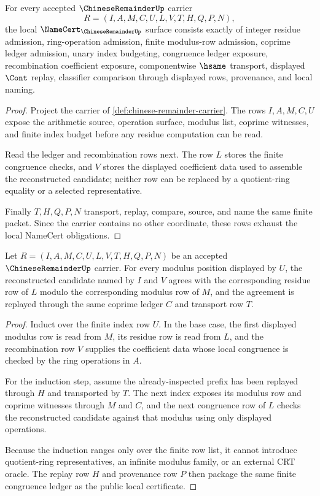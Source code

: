 \begin{theorem}
\label{thm:chinese-remainder-namecert-obligations}
For every accepted $\ChineseRemainderUp$ carrier
$$
R=(I,A,M,C,U,L,V,T,H,Q,P,N),
$$
the local $\NameCert_{\ChineseRemainderUp}$ surface consists exactly of integer residue admission, ring-operation admission, finite modulus-row admission, coprime ledger admission, unary index budgeting, congruence ledger exposure, recombination coefficient exposure, componentwise $\hsame$ transport, displayed $\Cont$ replay, classifier comparison through displayed rows, provenance, and local naming.
\end{theorem}
\begin{proof}
Project the carrier of \autoref{def:chinese-remainder-carrier}. The rows $I,A,M,C,U$ expose the arithmetic source, operation surface, modulus list, coprime witnesses, and finite index budget before any residue computation can be read.

Read the ledger and recombination rows next. The row $L$ stores the finite congruence checks, and $V$ stores the displayed coefficient data used to assemble the reconstructed candidate; neither row can be replaced by a quotient-ring equality or a selected representative.

Finally $T,H,Q,P,N$ transport, replay, compare, source, and name the same finite packet. Since the carrier contains no other coordinate, these rows exhaust the local NameCert obligations.
\end{proof}

\begin{theorem}
\label{thm:chinese-remainder-congruence-ledger}
Let $R=(I,A,M,C,U,L,V,T,H,Q,P,N)$ be an accepted $\ChineseRemainderUp$ carrier. For every modulus position displayed by $U$, the reconstructed candidate named by $I$ and $V$ agrees with the corresponding residue row of $L$ modulo the corresponding modulus row of $M$, and the agreement is replayed through the same coprime ledger $C$ and transport row $T$.
\end{theorem}
\begin{proof}
Induct over the finite index row $U$. In the base case, the first displayed modulus row is read from $M$, its residue row is read from $L$, and the recombination row $V$ supplies the coefficient data whose local congruence is checked by the ring operations in $A$.

For the induction step, assume the already-inspected prefix has been replayed through $H$ and transported by $T$. The next index exposes its modulus row and coprime witnesses through $M$ and $C$, and the next congruence row of $L$ checks the reconstructed candidate against that modulus using only displayed operations.

Because the induction ranges only over the finite row list, it cannot introduce quotient-ring representatives, an infinite modulus family, or an external CRT oracle. The replay row $H$ and provenance row $P$ then package the same finite congruence ledger as the public local certificate.
\end{proof}


